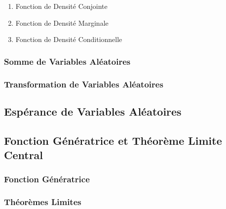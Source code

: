 \documentclass{article}
\begin{document}

\begin{enumerate}
    \item Fonction de Densité Conjointe
    \item Fonction de Densité Marginale
    \item Fonction de Densité Conditionnelle
\end{enumerate}


\subsubsection{Somme de Variables Aléatoires}
\subsubsection{Transformation de Variables Aléatoires}

\subsection{Espérance de Variables Aléatoires}

\subsection{Fonction Génératrice et Théorème Limite Central}

\subsubsection{Fonction Génératrice}

\subsubsection{Théorèmes Limites}

\end{document}
